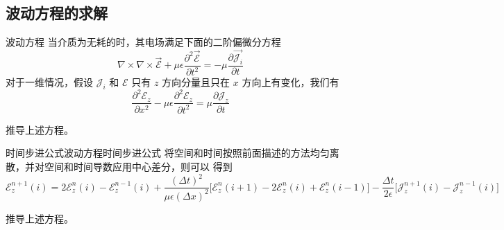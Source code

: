 \subsection{波动方程的求解}

\begin{definition}{波动方程}
    当介质为无耗的时，其电场满足下面的二阶偏微分方程
    \begin{equation}
        \nabla \times \nabla \times \vec{\mathscr{E}}
        +\mu \epsilon \frac{\partial^2 \vec{\mathscr{E}}}{\partial t^2}
        =-\mu \frac{\partial \vec{\mathscr{J}_i}}{\partial t}
    \end{equation}
    对于一维情况，假设 $\mathscr{J}_i$ 和 $\mathscr{E}$ 
    只有 $z$ 方向分量且只在 $x$ 方向上有变化，我们有
    \begin{equation}
        \frac{\partial^2 \mathscr{E}_z}{\partial x^2}
        -\mu \epsilon \frac{\partial^2 \mathscr{E}_z}{\partial t^2}
        =\mu \frac{\partial \mathscr{J}_z}{\partial t}
        \label{一维波动方程}
    \end{equation}
\end{definition}

\begin{exercise}
    推导上述方程。
\end{exercise}

\begin{theorem}{时间步进公式}{波动方程时间步进公式}
    将空间和时间按照前面描述的方法均匀离散，并对空间和时间导数应用中心差分，则可以
    得到
    \begin{equation}
        \mathscr{E}_z^{n+1}(i)=2\mathscr{E}_z^n(i)-\mathscr{E}_z^{n-1}(i)
        +\frac{(\Delta t)^2}{\mu \epsilon (\Delta x)^2}
        \Big[\mathscr{E}_z^n(i+1)-2\mathscr{E}_z^n(i)+\mathscr{E}_z^n(i-1)\Big]
        -\frac{\Delta t}{2\epsilon}\Big[\mathscr{J}_z^{n+1}(i)-\mathscr{J}_z^{n-1}(i)\Big]
    \end{equation}
\end{theorem}

\begin{exercise}
    推导上述方程。
\end{exercise}

